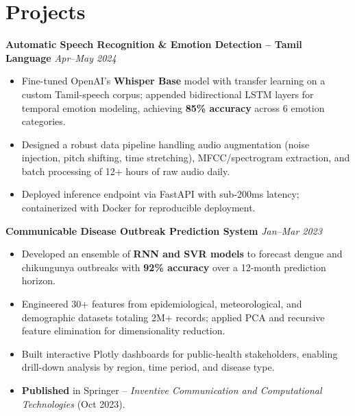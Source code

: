 \documentclass[11pt,letterpaper]{article}
\begin{document}
\section{Projects}

\textbf{Automatic Speech Recognition \& Emotion Detection -- Tamil Language} \hfill \textit{Apr--May 2024}
\begin{itemize}
  \item Fine-tuned OpenAI's \textbf{Whisper Base} model with transfer learning on a custom Tamil-speech corpus; appended bidirectional LSTM layers for temporal emotion modeling, achieving \textbf{85\% accuracy} across 6 emotion categories.
  \item Designed a robust data pipeline handling audio augmentation (noise injection, pitch shifting, time stretching), MFCC/spectrogram extraction, and batch processing of 12+ hours of raw audio daily.
  \item Deployed inference endpoint via FastAPI with sub-200ms latency; containerized with Docker for reproducible deployment.
\end{itemize}

\vspace{4pt}
\textbf{Communicable Disease Outbreak Prediction System} \hfill \textit{Jan--Mar 2023}
\begin{itemize}
  \item Developed an ensemble of \textbf{RNN and SVR models} to forecast dengue and chikungunya outbreaks with \textbf{92\% accuracy} over a 12-month prediction horizon.
  \item Engineered 30+ features from epidemiological, meteorological, and demographic datasets totaling 2M+ records; applied PCA and recursive feature elimination for dimensionality reduction.
  \item Built interactive Plotly dashboards for public-health stakeholders, enabling drill-down analysis by region, time period, and disease type.
  \item \textbf{Published} in Springer -- \textit{Inventive Communication and Computational Technologies} (Oct 2023).
\end{itemize}

\end{document}
